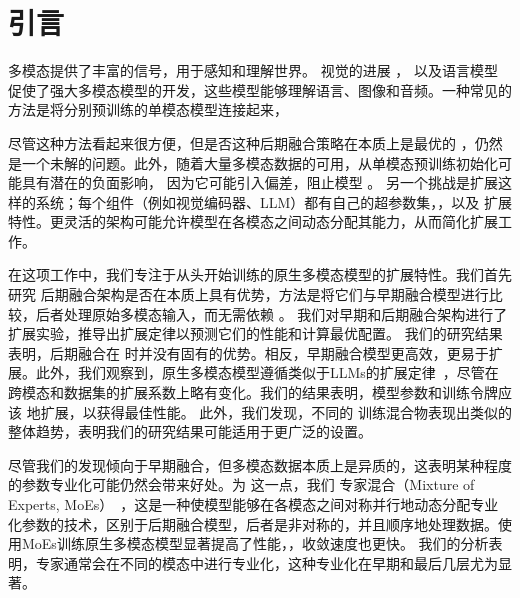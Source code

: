 \section{引言}
\label{sec:intro}

多模态提供了丰富的信号，用于感知和理解世界。
视觉的进展
\citep{radford2021learning,oquab2023dinov2,zhai2023sigmoidsiglip,fini2024multimodalaimv2}，
以及语言模型 \citep{achiam2023gpt4,team2023gemini,dubey2024llama3}
促使了强大多模态模型的开发，这些模型能够理解语言、图像和音频。一种常见的方法是将分别预训练的单模态模型连接起来，

尽管这种方法看起来很方便，但是否这种后期融合策略在本质上是最优的 ，仍然是一个未解的问题。此外，随着大量多模态数据的可用，从单模态预训练初始化可能具有潜在的负面影响，
因为它可能引入偏差，阻止模型 。
另一个挑战是扩展这样的系统；每个组件（例如视觉编码器、LLM）都有自己的超参数集，，以及  扩展特性。更灵活的架构可能允许模型在各模态之间动态分配其能力，从而简化扩展工作。

在这项工作中，我们专注于从头开始训练的原生多模态模型的扩展特性。我们首先研究  后期融合架构是否在本质上具有优势，方法是将它们与早期融合模型进行比较，后者处理原始多模态输入，而无需依赖 。
我们对早期和后期融合架构进行了扩展实验，推导出扩展定律以预测它们的性能和计算最优配置。
我们的研究结果表明，后期融合在  时并没有固有的优势。相反，早期融合模型更高效，更易于扩展。此外，我们观察到，原生多模态模型遵循类似于LLMs的扩展定律~\citep{hoffmann2022training}，尽管在跨模态和数据集的扩展系数上略有变化。我们的结果表明，模型参数和训练令牌应该  地扩展，以获得最佳性能。
此外，我们发现，不同的  训练混合物表现出类似的整体趋势，表明我们的研究结果可能适用于更广泛的设置。

尽管我们的发现倾向于早期融合，但多模态数据本质上是异质的，这表明某种程度的参数专业化可能仍然会带来好处。为  这一点，我们  专家混合（Mixture of Experts, MoEs）~\citep{shazeer2017outrageously}，这是一种使模型能够在各模态之间对称并行地动态分配专业化参数的技术，区别于后期融合模型，后者是非对称的，并且顺序地处理数据。使用MoEs训练原生多模态模型显著提高了性能，，收敛速度也更快。  我们的分析表明，专家通常会在不同的模态中进行专业化，这种专业化在早期和最后几层尤为显著。


